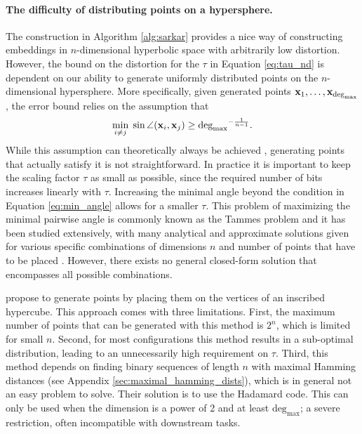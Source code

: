\paragraph{The difficulty of distributing points on a hypersphere.}
The construction in Algorithm \ref{alg:sarkar} provides a nice way of constructing embeddings in $n$-dimensional hyperbolic space with arbitrarily low distortion. However, the bound on the distortion for the $\tau$ in Equation \ref{eq:tau_nd} is dependent on our ability to generate uniformly distributed points on the $n$-dimensional hypersphere. More specifically, given generated points $\mathbf{x}_1, \ldots, \mathbf{x}_{\text{deg}_{\max}}$, the error bound relies on the assumption that
\begin{equation}\label{eq:min_angle}
    \min_{i \neq j} \; \sin \angle(\mathbf{x}_i, \mathbf{x}_j) \geq \text{deg}_{\max}{}^{-\frac{1}{n-1}}.
\end{equation}
While this assumption can theoretically always be achieved \citep{sala2018representation}, generating points that actually satisfy it is not straightforward. In practice it is important to keep the scaling factor $\tau$ as small as possible, since the required number of bits increases linearly with $\tau$. Increasing the minimal angle beyond the condition in Equation \ref{eq:min_angle} allows for a smaller $\tau$. This problem of maximizing the minimal pairwise angle is commonly known as the Tammes problem \citep{tammes1930origin,mettes2019hyperspherical} and it has been studied extensively, with many analytical and approximate solutions given for various specific combinations of dimensions $n$ and number of points that have to be placed \citep{cohn2024spherical}. However, there exists no general closed-form solution that encompasses all possible combinations.

\citep{sala2018representation} propose to generate points by placing them on the vertices of an inscribed hypercube. This approach comes with three limitations. First, the maximum number of points that can be generated with this method is $2^n$, which is limited for small $n$. Second, for most configurations this method results in a sub-optimal distribution, leading to an unnecessarily high requirement on $\tau$. Third, this method depends on finding binary sequences of length $n$ with maximal Hamming distances (see Appendix \ref{sec:maximal_hamming_dists}), which is in general not an easy problem to solve. Their solution is to use the Hadamard code. This can only be used when the dimension is a power of 2 and at least $\text{deg}_{\max}$; a severe restriction, often incompatible with downstream tasks. 

